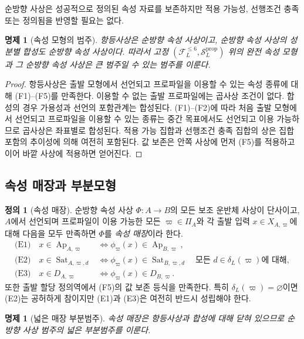 \documentclass[11pt]{article}
\newcommand{\FVI}{\mathcal F_{L}^{\le 6}}
\newcommand{\Sprop}{\mathcal S_{L}^{\mathrm{prop}}}
\newcommand{\Ap}{\operatorname{Ap}}
\newcommand{\Sat}{\operatorname{Sat}}
\newtheorem{proposition}[theorem]{명제}
\theoremstyle{definition}
\newtheorem{definition}[theorem]{정의}
\theoremstyle{remark}
\begin{document}
순방향 사상은 성공적으로 정의된 속성 자료를 보존하지만 적용 가능성, 선행조건 충족 또는 정의됨을 반영할 필요는 없다.

\begin{proposition}[속성 모형의 범주]
항등사상은 순방향 속성 사상이고, 순방향 속성 사상의 성분별 합성도 순방향 속성 사상이다.
따라서 고정 \((\FVI,\Sprop)\) 위의 완전 속성 모형과 그 순방향 속성 사상은 큰 범주일 수 있는 범주를 이룬다.
\end{proposition}

\begin{proof}
항등사상은 출발 모형에서 선언되고 프로파일을 이용할 수 있는 속성 종류에 대해 (F1)--(F5)를 만족한다.
이용할 수 없는 출발 프로파일에는 곱사상 조건이 없다.
합성의 경우 가용성과 선언의 포함관계는 합성된다.
(F1)--(F2)에 따라 처음 출발 모형에서 선언되고 프로파일을 이용할 수 있는 종류는 중간 목표에서도 선언되고 이용 가능하므로 곱사상은 좌표별로 합성된다.
적용 가능 집합과 선행조건 충족 집합의 상은 집합 포함의 추이성에 의해 여전히 포함된다.
값 보존은 안쪽 사상에 먼저 (F5)를 적용하고 이어 바깥 사상에 적용하면 얻어진다.
\end{proof}

\subsection{속성 매장과 부분모형}

\begin{definition}[속성 매장]
순방향 속성 사상 \(\Phi:A\to B\)의 모든 보조 운반체 사상이 단사이고, \(A\)에서 선언되며 프로파일이 이용 가능한 모든 \(\varpi\in\Pi_A\)와 각 출발 입력 \(x\in X_{A,\varpi}\)에 대해 다음을 모두 만족하면 \(\Phi\)를 \emph{속성 매장}이라 한다.
\[
\begin{aligned}
\text{(E1)}\quad x\in\Ap_{A,\varpi}
&\Longleftrightarrow
\phi_{\varpi}(x)\in\Ap_{B,\varpi},\\
\text{(E2)}\quad x\in\Sat_{A,\varpi,d}
&\Longleftrightarrow
\phi_{\varpi}(x)\in\Sat_{B,\varpi,d}
\quad\text{모든 }d\in\delta_L(\varpi)\text{에 대해},\\
\text{(E3)}\quad x\in D_{A,\varpi}
&\Longleftrightarrow
\phi_{\varpi}(x)\in D_{B,\varpi}.
\end{aligned}
\]
또한 출발 할당 정의역에서 (F5)의 값 보존 등식을 만족한다.
특히 \(\delta_L(\varpi)=\varnothing\)이면 (E2)는 공허하게 참이지만 (E1)과 (E3)은 여전히 반드시 성립해야 한다.
\end{definition}

\begin{proposition}[넓은 매장 부분범주]
속성 매장은 항등사상과 합성에 대해 닫혀 있으므로 순방향 사상 범주의 넓은 부분범주를 이룬다.
\end{proposition}
\end{document}

